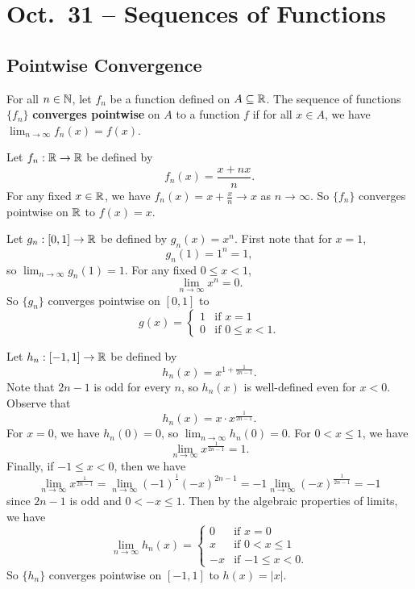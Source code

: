 \chapter{Oct.~31 -- Sequences of Functions}

\section{Pointwise Convergence}
\begin{definition}
  For all $n \in \mathbb{N}$, let $f_n$ be a function defined
  on $A \subseteq \mathbb{R}$. The sequence of functions $\{f_n\}$
  \textbf{converges pointwise} on $A$ to a function $f$ if
  for all $x \in A$, we have
  $\lim_{n \to \infty} f_n(x) = f(x)$.
\end{definition}

\begin{example}
  Let $f_n : \mathbb{R} \to \mathbb{R}$ be defined by
  \[f_n(x) = \frac{x + nx}{n}.\]
  For any fixed $x \in \mathbb{R}$, we have
  $f_n(x) = x + \frac{x}{n} \to x$ as $n \to \infty$.
  So $\{f_n\}$ converges pointwise on $\mathbb{R}$ to $f(x) = x$.
\end{example}

\begin{example}
  Let $g_n : [0, 1] \to \mathbb{R}$ be defined by $g_n(x) = x^n$.
  First note that for $x = 1$,
  \[g_n(1) = 1^n = 1,\]
  so $\lim_{n \to \infty} g_n(1) = 1$. For any
  fixed $0 \le x < 1$,
  \[\lim_{n \to \infty} x^n = 0.\]
  So $\{g_n\}$ converges pointwise on $[0, 1]$ to
  \[g(x) = \begin{cases}
    1 & \text{if }x = 1 \\
    0 & \text{if } 0 \le x < 1.
  \end{cases}\]
\end{example}

\begin{example}
  Let $h_n : [-1, 1] \to \mathbb{R}$ be defined by
  \[
    h_n(x) = x^{1 + \frac{1}{2n - 1}}
  .\]
  Note that $2n - 1$ is odd for every $n$, so $h_n(x)$
  is well-defined even for $x < 0$. Observe that
  \[h_n(x) = x \cdot x^{\frac{1}{2n - 1}}.\]
  For $x = 0$, we have $h_n(0) = 0$, so
  $\lim_{n \to \infty} h_n(0) = 0$. For $0 < x \le 1$,
  we have
  \[\lim_{n \to \infty} x^{\frac{1}{2n - 1}} = 1.\]
  Finally, if $-1 \le x < 0$, then we have
  \[\lim_{n \to \infty} x^{\frac{1}{2n - 1}} = \lim_{n \to \infty} (-1)^{\frac{1}{}}(-x)^{2n - 1} = -1 \lim_{n \to \infty} (-x)^{\frac{1}{2n - 1}} = -1\]
  since $2n - 1$ is odd and $0 < -x \le 1$. Then by the
  algebraic properties of limits, we have
  \[
    \lim_{n \to \infty} h_n(x) = \begin{cases}
      0 & \text{if } x = 0 \\
      x & \text{if } 0 < x \le 1 \\
      -x & \text{if } {-1 \le x < 0}.
    \end{cases}
  \]
  So $\{h_n\}$ converges pointwise on $[-1, 1]$ to
  $h(x) = |x|$.
\end{example}

